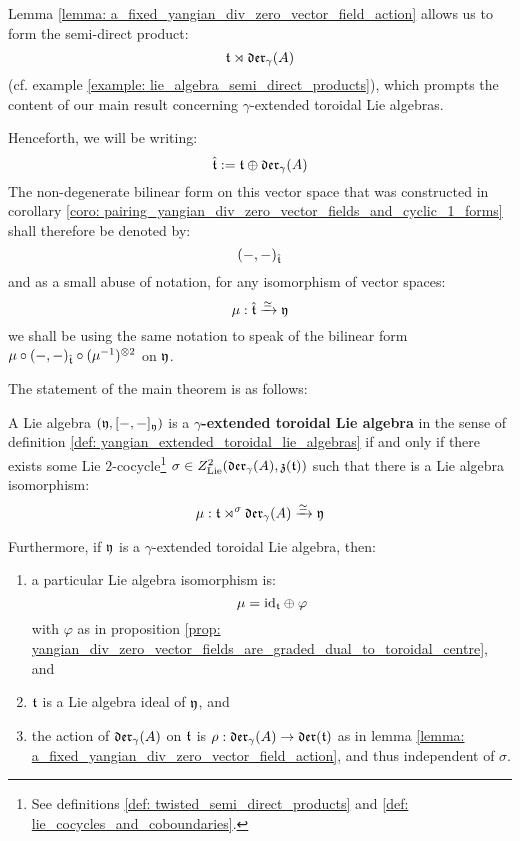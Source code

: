         Lemma \ref{lemma: a_fixed_yangian_div_zero_vector_field_action} allows us to form the semi-direct product:
            $$\mathfrak{t} \rtimes \mathfrak{der}_{\gamma}(A)$$
        (cf. example \ref{example: lie_algebra_semi_direct_products}), which prompts the content of our main result concerning $\gamma$-extended toroidal Lie algebras.
        \begin{convention}
            Henceforth, we will be writing:
                $$\hat{\mathfrak{t}} := \mathfrak{t} \oplus \mathfrak{der}_{\gamma}(A)$$
            The non-degenerate bilinear form on this vector space that was constructed in corollary \ref{coro: pairing_yangian_div_zero_vector_fields_and_cyclic_1_forms} shall therefore be denoted by:
                $$(-, -)_{\hat{\mathfrak{t}}}$$
            and as a small abuse of notation, for any isomorphism of vector spaces:
                $$\mu: \hat{\mathfrak{t}} \xrightarrow[]{\simeq} \mathfrak{y}$$
            we shall be using the same notation to speak of the bilinear form $\mu \circ (-, -)_{\extendedtoroidal} \circ (\mu^{-1})^{\tensor 2}$ on $\mathfrak{y}$. 
        \end{convention}
        The statement of the main theorem is as follows:
        \begin{theorem} \label{theorem: yangian_extended_toroidal_lie_algebras_main_theorem}
            A Lie algebra $(\mathfrak{y}, [-, -]_{\mathfrak{y}})$ is a \textbf{$\gamma$-extended toroidal Lie algebra} in the sense of definition \ref{def: yangian_extended_toroidal_lie_algebras} if and only if there exists some Lie $2$-cocycle\footnote{See definitions \ref{def: twisted_semi_direct_products} and \ref{def: lie_cocycles_and_coboundaries}.} $\sigma \in Z^2_{\mathrm{Lie}}(\mathfrak{der}_{\gamma}(A), \mathfrak{z}(\mathfrak{t}))$ such that there is a Lie algebra isomorphism:
                $$\mu: \mathfrak{t} \rtimes^{\sigma} \mathfrak{der}_{\gamma}(A) \xrightarrow[]{\simeq} \mathfrak{y}$$
                
            Furthermore, if $\mathfrak{y}$ is a $\gamma$-extended toroidal Lie algebra, then:
            \begin{enumerate}
                \item a particular Lie algebra isomorphism is:
                    $$\mu = \mathrm{id}_{\mathfrak{t}} \oplus \varphi$$
                with $\varphi$ as in proposition \ref{prop: yangian_div_zero_vector_fields_are_graded_dual_to_toroidal_centre}, and
                \item $\mathfrak{t}$ is a Lie algebra ideal of $\mathfrak{y}$, and
                \item the action of $\mathfrak{der}_{\gamma}(A)$ on $\mathfrak{t}$ is $\rho: \mathfrak{der}_{\gamma}(A) \to \mathfrak{der}(\mathfrak{t})$ as in lemma \ref{lemma: a_fixed_yangian_div_zero_vector_field_action}, and thus independent of $\sigma$.
            \end{enumerate}
        \end{theorem}
        \begin{remark}
        \end{remark}
    
